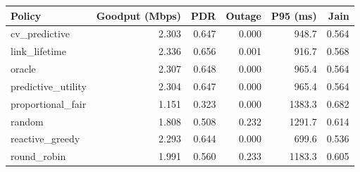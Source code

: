 \begin{tabular}{lrrrrr}
\toprule
Policy & Goodput (Mbps) & PDR & Outage & P95 (ms) & Jain \\
\midrule
cv\_predictive & 2.303 & 0.647 & 0.000 & 948.7 & 0.564 \\
link\_lifetime & 2.336 & 0.656 & 0.001 & 916.7 & 0.568 \\
oracle & 2.307 & 0.648 & 0.000 & 965.4 & 0.564 \\
predictive\_utility & 2.304 & 0.647 & 0.000 & 965.4 & 0.564 \\
proportional\_fair & 1.151 & 0.323 & 0.000 & 1383.3 & 0.682 \\
random & 1.808 & 0.508 & 0.232 & 1291.7 & 0.614 \\
reactive\_greedy & 2.293 & 0.644 & 0.000 & 699.6 & 0.536 \\
round\_robin & 1.991 & 0.560 & 0.233 & 1183.3 & 0.605 \\
\bottomrule
\end{tabular}
